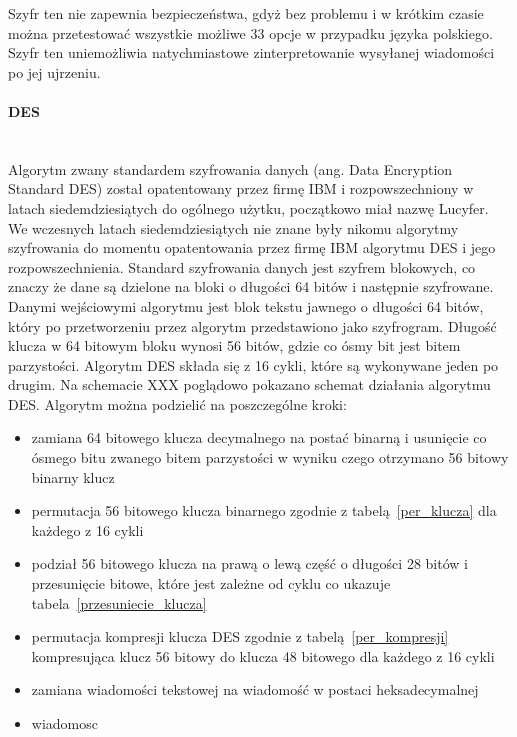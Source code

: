 \documentclass[12p]{article}
\begin{document}
Szyfr ten nie zapewnia bezpieczeństwa, gdyż bez problemu i w krótkim czasie można przetestować wszystkie możliwe 33 opcje w przypadku języka polskiego. Szyfr ten uniemożliwia natychmiastowe zinterpretowanie wysyłanej wiadomości po jej ujrzeniu.

\paragraph{DES}\mbox{} \\

Algorytm zwany standardem szyfrowania danych (ang. Data Encryption Standard DES) został opatentowany przez firmę IBM i rozpowszechniony w latach siedemdziesiątych do ogólnego użytku, początkowo miał nazwę Lucyfer. We wczesnych latach siedemdziesiątych nie znane były nikomu algorytmy szyfrowania do momentu opatentowania przez firmę IBM algorytmu DES i jego rozpowszechnienia. Standard szyfrowania danych jest szyfrem blokowych, co znaczy że dane są dzielone na bloki o długości 64 bitów i następnie szyfrowane. Danymi wejściowymi algorytmu jest blok tekstu jawnego o długości 64 bitów, który po przetworzeniu przez algorytm przedstawiono jako szyfrogram. Długość klucza w 64 bitowym bloku wynosi 56 bitów, gdzie co ósmy bit jest bitem parzystości. Algorytm DES składa się z 16 cykli, które są wykonywane jeden po drugim. Na schemacie XXX poglądowo pokazano schemat działania algorytmu DES. Algorytm można podzielić na poszczególne kroki:

\begin{itemize}
\item zamiana 64 bitowego klucza decymalnego na postać binarną i usunięcie co ósmego bitu zwanego bitem parzystości w wyniku czego otrzymano 56 bitowy binarny klucz
\item permutacja 56 bitowego klucza binarnego zgodnie z tabelą~\ref{per_klucza} dla każdego z 16 cykli
\item podział 56 bitowego klucza na prawą o lewą część o długości 28 bitów i przesunięcie bitowe, które jest zależne od cyklu co ukazuje tabela~\ref{przesuniecie_klucza}
\item permutacja kompresji klucza DES zgodnie z tabelą~\ref{per_kompresji} kompresująca klucz 56 bitowy do klucza 48 bitowego dla każdego z 16 cykli
\item zamiana wiadomości tekstowej na wiadomość w postaci heksadecymalnej
\item wiadomosc
\end{itemize}
\end{document}

